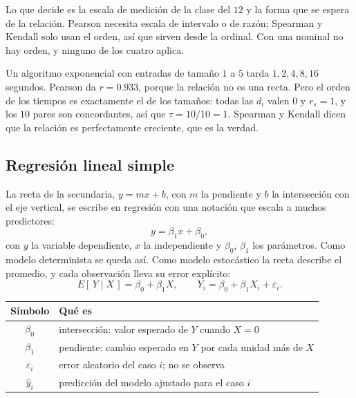 \documentclass[11pt,letterpaper]{article}
\begin{document}
Lo que decide es la escala de medición de la clase del $12$ y la forma
que se espera de la relación. Pearson necesita escala de intervalo o de
razón; Spearman y Kendall solo usan el orden, así que sirven desde la
ordinal. Con una nominal no hay orden, y ninguno de los cuatro aplica.

\begin{ejemplo}
    Un algoritmo exponencial con entradas de tamaño $1$ a $5$ tarda
    $1, 2, 4, 8, 16$ segundos. Pearson da $r = 0.933$, porque la
    relación no es una recta. Pero el orden de los tiempos es
    exactamente el de los tamaños: todas las $d_i$ valen $0$ y
    $r_s = 1$, y los $10$ pares son concordantes, así que
    $\tau = 10 / 10 = 1$. Spearman y Kendall dicen que la relación es
    perfectamente creciente, que es la verdad.
\end{ejemplo}


\subsection*{Regresión lineal simple}

La recta de la secundaria, $y = mx + b$, con $m$ la pendiente y $b$ la
intersección con el eje vertical, se escribe en regresión con una
notación que escala a muchos predictores:
\[
    y = \beta_1 x + \beta_0 ,
\]
con $y$ la variable dependiente, $x$ la independiente y $\beta_0$,
$\beta_1$ los parámetros. Como modelo determinista se queda así. Como
modelo estocástico la recta describe el promedio, y cada observación
lleva su error explícito:
\[
    E[\,Y \mid X\,] = \beta_0 + \beta_1 X ,
    \qquad
    Y_i = \beta_0 + \beta_1 X_i + \varepsilon_i .
\]

\begin{center}
\small
\begin{tabular}{c>{\raggedright\arraybackslash}p{9.5cm}}
    \toprule
    \textbf{Símbolo} & \textbf{Qué es} \\
    \midrule
    $\beta_0$ & intersección: valor esperado de $Y$ cuando $X = 0$ \\
    $\beta_1$ & pendiente: cambio esperado en $Y$ por cada unidad más
                de $X$ \\
    $\varepsilon_i$ & error aleatorio del caso $i$; no se observa \\
    $\hat{y}_i$ & predicción del modelo ajustado para el caso $i$ \\
    \bottomrule
\end{tabular}
\end{center}
\end{document}

